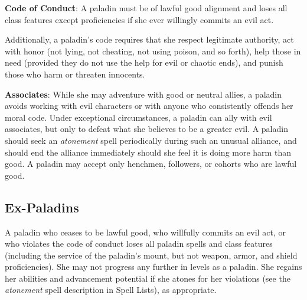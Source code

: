 \textbf{Code of Conduct}: A paladin must be of lawful good alignment and loses all class features except proficiencies if she ever willingly commits an evil act.
				
Additionally, a paladin's code requires that she respect legitimate authority, act with honor (not lying, not cheating, not using poison, and so forth), help those in need (provided they do not use the help for evil or chaotic ends), and punish those who harm or threaten innocents.
				
\textbf{Associates}: While she may adventure with good or neutral allies, a paladin avoids working with evil characters or with anyone who consistently offends her moral code. Under exceptional circumstances, a paladin can ally with evil associates, but only to defeat what she believes to be a greater evil. A paladin should seek an \textit{atonement} spell periodically during such an unusual alliance, and should end the alliance immediately should she feel it is doing more harm than good. A paladin may accept only henchmen, followers, or cohorts who are lawful good.
				
\subsection{Ex-Paladins}

				
A paladin who ceases to be lawful good, who willfully commits an evil act, or who violates the code of conduct loses all paladin spells and class features (including the service of the paladin's mount, but not weapon, armor, and shield proficiencies). She may not progress any further in levels as a paladin. She regains her abilities and advancement potential if she atones for her violations (see the \textit{atonement} spell description in Spell Lists), as appropriate.
        	
